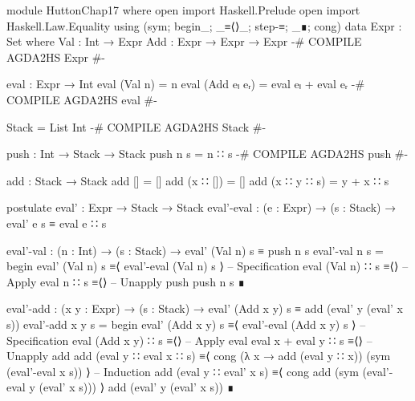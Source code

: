 \documentclass{article}
\begin{document}
\begin{code}
module HuttonChap17 where
open import Haskell.Prelude
open import Haskell.Law.Equality using (sym; begin_; _≡⟨⟩_; step-≡; _∎; cong)
data Expr : Set where
    Val : Int → Expr
    Add : Expr → Expr → Expr
{-# COMPILE AGDA2HS Expr #-}

eval : Expr → Int
eval (Val n) = n
eval (Add eₗ eᵣ) = eval eₗ + eval eᵣ
{-# COMPILE AGDA2HS eval #-}

Stack = List Int
{-# COMPILE AGDA2HS Stack #-}

push : Int → Stack → Stack
push n s = n ∷ s
{-# COMPILE AGDA2HS push #-}

add : Stack → Stack
add [] = []
add (x ∷ []) = []
add (x ∷ y ∷ s) = y + x ∷ s

postulate
  eval' : Expr → Stack → Stack
  eval'-eval : (e : Expr) → (s : Stack) → eval' e s ≡ eval e ∷ s

eval'-val : (n : Int) → (s : Stack)
  → eval' (Val n) s ≡ push n s
eval'-val n s =
  begin
    eval' (Val n) s
  ≡⟨ eval'-eval (Val n) s ⟩ -- Specification
    eval (Val n) ∷ s
  ≡⟨⟩ -- Apply eval
    n ∷ s
  ≡⟨⟩ -- Unapply push
    push n s
  ∎
\end{code}
\begin{code}
eval'-add : (x y : Expr) → (s : Stack)
  → eval' (Add x y) s ≡ add (eval' y (eval' x s))
eval'-add x y s =
  begin
    eval' (Add x y) s
  ≡⟨ eval'-eval (Add x y) s ⟩ -- Specification
    eval (Add x y) ∷ s
  ≡⟨⟩ -- Apply eval
    eval x + eval y ∷ s
  ≡⟨⟩ -- Unapply add
    add (eval y ∷ eval x ∷ s)
  ≡⟨ cong (λ x → add (eval y ∷ x)) (sym (eval'-eval x s)) ⟩ -- Induction
    add (eval y ∷ eval' x s)
  ≡⟨ cong add (sym (eval'-eval y (eval' x s))) ⟩
    add (eval' y (eval' x s))
  ∎
\end{code}   
\end{document}
